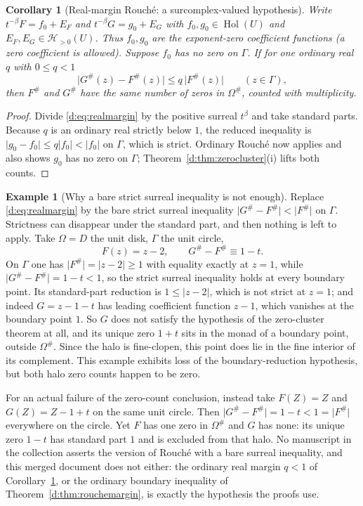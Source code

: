 \documentclass[11pt,a4paper]{article}
\numberwithin{equation}{section}
\newtheorem{corollary}[theorem]{Corollary}
\theoremstyle{definition}
\newtheorem{example}[theorem]{Example}
\theoremstyle{remark}
\theoremstyle{plain}
\DeclareMathOperator{\Hol}{Hol}
\newcommand{\tm}{t}
\newcommand{\halo}[1]{#1^{\#}}
\newcommand{\ev}[1]{#1^{\#}}
\newcommand{\Hc}{\mathcal H}
\newcommand{\abs}[1]{\lvert #1\rvert}
\begin{document}
\begin{corollary}[Real-margin Rouch\'e: a surcomplex-valued hypothesis]
\label{d:cor:rouchereal}
Write $\tm^{-\beta}F=f_0+E_F$ and
$\tm^{-\beta}G=g_0+E_G$ with $f_0,g_0\in\Hol(U)$ and
$E_F,E_G\in\Hc_{>0}(U)$. Thus $f_0,g_0$ are the exponent-zero
coefficient functions (a zero coefficient is allowed). Suppose $f_0$
has no zero on $\Gamma$.  If for \emph{one ordinary real} $q$ with
$0\le q<1$
\begin{equation}\label{d:eq:realmargin}
 \bigl\lvert\ev G(z)-\ev F(z)\bigr\rvert\le q\,\bigl\lvert\ev F(z)\bigr\rvert
 \qquad(z\in\Gamma),
\end{equation}
then $\ev F$ and $\ev G$ have the same number of zeros in
$\halo\Omega$, counted with multiplicity.
\end{corollary}

\begin{proof}
Divide \eqref{d:eq:realmargin} by the positive surreal $\tm^{\beta}$
and take standard parts.  Because $q$ is an ordinary real strictly
below $1$, the reduced inequality is
$\abs{g_0-f_0}\le q\abs{f_0}<\abs{f_0}$ on $\Gamma$, which is strict.
Ordinary Rouch\'e now applies and also shows $g_0$ has no zero on
$\Gamma$; Theorem~\ref{d:thm:zerocluster}(i) lifts both counts.
\end{proof}

\begin{example}[Why a bare strict surreal inequality is not enough]
\label{d:ex:nomargin}
Replace \eqref{d:eq:realmargin} by the bare strict surreal inequality
$\abs{\ev G-\ev F}<\abs{\ev F}$ on $\Gamma$.  Strictness can disappear
under the standard part, and then nothing is left to apply.  Take
$\Omega=D$ the unit disk, $\Gamma$ the unit circle,
\[
 F(z)=z-2,\qquad \ev G-\ev F\equiv 1-\tm .
\]
On $\Gamma$ one has $\abs{\ev F}=\abs{z-2}\ge1$ with equality exactly at
$z=1$, while $\abs{\ev G-\ev F}=1-\tm<1$, so the strict surreal
inequality holds at every boundary point.  Its standard-part reduction
is $1\le\abs{z-2}$, which is not strict at $z=1$; and indeed
$G=z-1-\tm$ has leading coefficient function $z-1$, which vanishes at
the boundary point $1$.  So $G$ does not satisfy the hypothesis of the
zero-cluster theorem at all, and its unique zero $1+\tm$ sits in the
monad of a boundary point, outside $\halo\Omega$. Since the halo is fine-clopen, this
point does lie in the fine interior of its complement. This example
exhibits loss of the boundary-reduction hypothesis, but both halo zero
counts happen to be zero.

For an actual failure of the zero-count conclusion, instead take
$F(Z)=Z$ and $G(Z)=Z-1+\tm$ on the same unit circle. Then
$\abs{\ev G-\ev F}=1-\tm<1=\abs{\ev F}$ everywhere on the circle.
Yet $F$ has one zero in $\halo\Omega$ and $G$ has none: its unique
zero $1-\tm$ has standard part $1$ and is excluded from that halo.
No manuscript in the collection asserts the
version of Rouch\'e with a bare surreal inequality, and this merged
document does not either: the ordinary real margin $q<1$ of
Corollary~\ref{d:cor:rouchereal}, or the ordinary boundary inequality of
Theorem~\ref{d:thm:rouchemargin}, is exactly the hypothesis the proofs
use.
\end{example}
\end{document}
